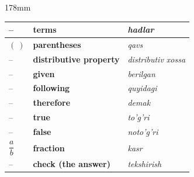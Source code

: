 \documentclass[a4paper]{article}
\begin{document}
\begin{textblock*}{178mm}
{\begin{tabular}{|>{\centering\arraybackslash}p{22mm}|p{68mm}|p{72mm}|}
-- & \textbf{terms} & \textit{hadlar} \\ \hline
\rowcolor{badge!18}
$(\ )$ & \textbf{parentheses} & \textit{qavs} \\ \hline
-- & \textbf{distributive property} & \textit{distributiv xossa} \\ \hline
\rowcolor{badge!18}
-- & \textbf{given} & \textit{berilgan} \\ \hline
-- & \textbf{following} & \textit{quyidagi} \\ \hline
\rowcolor{badge!18}
-- & \textbf{therefore} & \textit{demak} \\ \hline
-- & \textbf{true} & \textit{to'g'ri} \\ \hline
\rowcolor{badge!18}
-- & \textbf{false} & \textit{noto'g'ri} \\ \hline
$\dfrac{a}{b}$ & \textbf{fraction} & \textit{kasr} \\ \hline
\rowcolor{badge!18}
-- & \textbf{check (the answer)} & \textit{tekshirish} \\ \hline
\end{tabular}
}
\end{textblock*}
\end{document}
